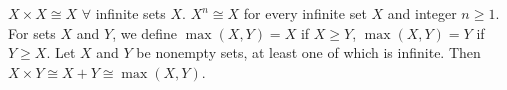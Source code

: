  $X \times X \cong X$ $\forall$ infinite sets $X$.
 $X^n \cong X$ for every infinite set $X$ and integer $n \geq 1$.
 For sets $X$ and $Y$, we define $\max(X, Y) = X$ if $X \geq Y$, $\max(X, Y) = Y$ if $Y \geq X$.
 Let $X$ and $Y$ be nonempty sets, at least one of which is infinite. Then $X \times Y \cong X + Y \cong \max(X, Y)$.
